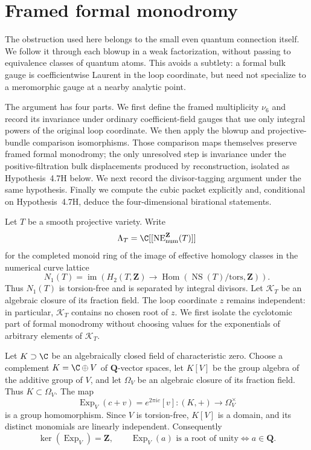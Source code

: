 \section{Framed formal monodromy}
\label{sec:one-step}

The obstruction used here belongs to the small even quantum connection itself.
We follow it through each blowup in a weak factorization, without passing to
equivalence classes of quantum atoms.  This avoids a subtlety: a formal bulk
gauge is coefficientwise Laurent in the loop coordinate, but need not
specialize to a meromorphic gauge at a nearby analytic point.

The argument has four parts.  We first define the framed multiplicity
\(\nu_6\) and record its invariance under ordinary coefficient-field gauges
that use only integral powers of the original loop coordinate.  We then apply
the blowup and projective-bundle comparison isomorphisms.  Those comparison
maps themselves preserve framed formal monodromy; the only unresolved step is
invariance under the positive-filtration bulk displacements produced by
reconstruction, isolated as Hypothesis~4.7H below.  We next record the
divisor-tagging argument under the same hypothesis.  Finally we compute the
cubic packet explicitly and, conditional on Hypothesis~4.7H, deduce the
four-dimensional birational statements.

Let \(T\) be a smooth projective variety.  Write
\[
 \Lambda_T=\C[[\operatorname{NE}^{\mathbf Z}_{\rm num}(T)]]
\]
for the completed monoid ring of the image of effective homology classes in
the numerical curve lattice
\[
 N_1(T)=\operatorname{im}\!\left(
 H_2(T,\mathbf Z)\longrightarrow
 \operatorname{Hom}(\operatorname{NS}(T)/\mathrm{tors},\mathbf Z)\right).
\]
Thus \(N_1(T)\) is torsion-free and is separated by integral divisors.  Let
\(\mathcal K_T\) be an algebraic closure of its fraction field.  The loop
coordinate \(z\) remains independent: in particular, \(\mathcal K_T\)
contains no chosen root of \(z\).  We first isolate the cyclotomic part of
formal monodromy without choosing values for the exponentials of arbitrary
elements of \(\mathcal K_T\).

Let \(K\supset\C\) be an algebraically closed field of characteristic zero.
Choose a complement \(K=\C\oplus V\) of \(\mathbf Q\)-vector spaces, let
\(K[V]\) be the group algebra of the additive group of \(V\), and let
\(\Omega_V\) be an algebraic closure of its fraction field.  Thus
\(K\subset\Omega_V\).  The map
\[
 \operatorname{Exp}_V(c+v)=e^{2\pi i c}[v]
 \colon (K,+)\longrightarrow\Omega_V^\times
 \tag{4.0}
 \label{eq:universal-exponential}
\]
is a group homomorphism.  Since \(V\) is torsion-free, \(K[V]\) is a domain,
and its distinct monomials are linearly independent.  Consequently
\[
 \ker(\operatorname{Exp}_V)=\mathbf Z,
 \qquad
 \operatorname{Exp}_V(a)\text{ is a root of unity}
 \Longleftrightarrow a\in\mathbf Q.
 \tag{4.0a}
 \label{eq:universal-exponential-torsion}
\]

